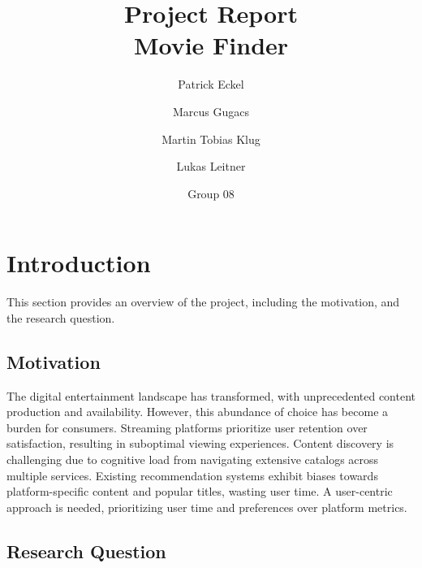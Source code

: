 \documentclass[12pt,a4paper]{article}
\begin{document}
\title{Project Report \\ Movie Finder}

\author{
    \small Patrick Eckel\\\and
    \small Marcus Gugacs\\\and
    \small Martin Tobias Klug\\\and
    \small Lukas Leitner\\\and
}
\date{Group 08}
\maketitle

\begin{abstract}
\noindent \small
\end{abstract}

\small \tableofcontents

\begin{appendix}
  \small  %
  \small 
  \small \listoffigures
\end{appendix}

\newpage

\section{Introduction}
This section provides an overview of the project, including the motivation, and the research question.

\subsection{Motivation}

The digital entertainment landscape has transformed, with unprecedented content production and availability.
However, this abundance of choice has become a burden for consumers.
Streaming platforms prioritize user retention
over satisfaction, resulting in suboptimal viewing experiences.
Content discovery is challenging due to cognitive load from navigating extensive catalogs across multiple services.
Existing recommendation systems exhibit biases towards platform-specific content and popular titles, wasting user time.
A user-centric approach is needed, prioritizing user time and preferences over platform metrics.

\subsection{Research Question}
\end{document}
